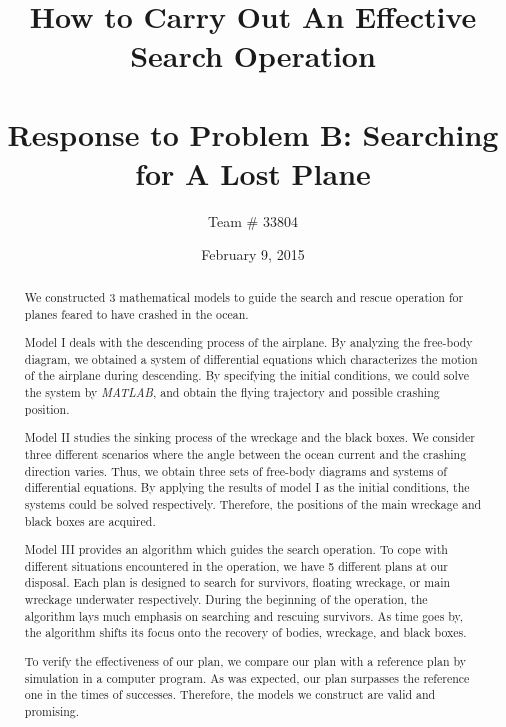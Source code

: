\documentclass[a4paper,11pt]{article}
\begin{document}
\title{\LARGE {\bf How to Carry Out An Effective Search Operation} \\ \tiny ~ \\ \large Response to Problem B: Searching for A Lost Plane}
\author{Team \# 33804}
\date{February 9, 2015}
\maketitle
\begin{spacing}{1.0}

\begin{abstract}
We constructed 3 mathematical models to guide the search and rescue operation for planes feared to have crashed in the ocean. 

Model I deals with the descending process of the airplane. By analyzing the free-body diagram, we obtained a system of differential equations which characterizes the motion of the airplane during descending. By specifying the initial conditions, we could solve the system by \textit{MATLAB}, and obtain the flying trajectory and possible crashing position.

Model II studies the sinking process of the wreckage and the black boxes. We consider three different scenarios where the angle between the ocean current and the crashing direction varies. Thus, we obtain three sets of free-body diagrams and systems of differential equations. By applying the results of model I as the initial conditions, the systems could be solved respectively. Therefore, the positions of the main wreckage and black boxes are acquired.

Model III provides an algorithm which guides the search operation. To cope with different situations encountered in the operation, we have 5 different plans at our disposal. Each plan is designed to search for survivors, floating wreckage, or main wreckage underwater respectively. During the beginning of the operation, the algorithm lays much emphasis on searching and rescuing survivors. As time goes by, the algorithm shifts its focus onto the recovery of bodies, wreckage, and black boxes.

To verify the effectiveness of our plan, we compare our plan with a reference plan by simulation in a computer program. As was expected, our plan surpasses the reference one in the times of successes. Therefore, the models we construct are valid and promising.




\end{abstract}
\end{spacing}
\end{document}
